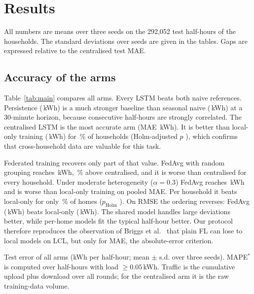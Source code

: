 \section{Results}\label{sec:results}

All numbers are means over three seeds on the 292{,}052 test half-hours of the \NumHouseholds{} households. The
standard deviations over seeds are given in the tables. Gaps are expressed relative to the centralised test MAE.

\subsection{Accuracy of the arms}\label{sec:res-main}
Table~\ref{tab:main} compares all arms. Every LSTM beats both naive references. Persistence (\PersistenceMAE{}\,kWh) is a much stronger
baseline than seasonal naive (\SeasonalNaiveMAE{}\,kWh) at a 30-minute horizon, because consecutive half-hours are
strongly correlated. The centralised LSTM is the most
accurate arm (MAE \EtwocentralizedMAE{}\,kWh). It is better than local-only training (\EonelocalMAE{}\,kWh) for
\StEtwocentralizedvsEonelocalBetter{}\,\% of households (Holm-adjusted $p$ \StEtwocentralizedvsEonelocalP{}), which
confirms that cross-household data are valuable for this task.

Federated training recovers only part of that value. FedAvg with random grouping reaches \EthreefedavgiidMAE{}\,kWh,
\EthreefedavgiidGap{}\,\% above centralised, and it is worse than centralised for every household. Under moderate
heterogeneity ($\alpha=0.3$) FedAvg reaches \EfourfedavgmoderateMAE{}\,kWh and is worse than local-only training on
pooled MAE. Per household it beats local-only for only \StEfourfedavgmoderatevsEonelocalBetter{}\,\% of homes
($p_{\mathrm{Holm}}$ \StEfourfedavgmoderatevsEonelocalP{}). On RMSE the ordering reverses: FedAvg
(\EfourfedavgmoderateRMSE{}\,kWh) beats local-only (\EonelocalRMSE{}\,kWh). The shared model handles large deviations
better, while per-home models fit the typical half-hour better. Our protocol therefore reproduces the observation of
Briggs et al.~\cite{briggs2022} that plain FL can lose to local models on LCL, but only for MAE, the absolute-error
criterion.

\begin{table}[t]
\centering\scriptsize
\caption{Test error of all arms (kWh per half-hour; mean $\pm$ s.d. over three seeds). MAPE$^\ast$ is computed over
half-hours with load $\geq0.05$\,kWh. Traffic is the cumulative upload plus download over all rounds; for the
centralised arm it is the raw training-data volume.}\label{tab:main}
\begin{adjustbox}{max width=\textwidth}\end{adjustbox}
\end{table}

